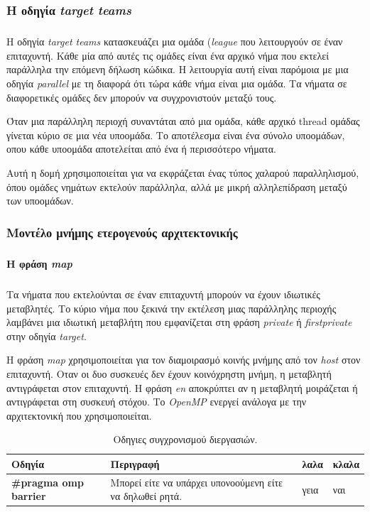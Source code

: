 \documentclass[12pt]{article}
\newcommand{\en}[1]{\foreignlanguage{english}{#1}}
\begin{document}
\subsubsection{H οδηγία \emph{\en{target teams}}}
\subparagraph{}
Η οδηγία \emph{\en{target teams}} κατασκευάζει μια ομάδα (\emph{\en{league}} που λειτουργούν σε έναν επιταχυντή. Κάθε μία από αυτές τις ομάδες είναι ένα αρχικό νήμα που εκτελεί παράλληλα την επόμενη δήλωση κώδικα. Η λειτουργία αυτή είναι παρόμοια με μια οδηγία \emph{\en{parallel}} με τη διαφορά ότι τώρα κάθε νήμα είναι μια ομάδα. Τα νήματα σε διαφορετικές ομάδες δεν μπορούν να συγχρονιστούν μεταξύ τους.

Όταν μια παράλληλη περιοχή συναντάται από μια ομάδα, κάθε αρχικό thread ομάδας γίνεται κύριο σε μια νέα υποομάδα. Το αποτέλεσμα είναι ένα σύνολο υποομάδων, οπου κάθε υποομάδα αποτελείται από ένα ή περισσότερο νήματα.

Αυτή η δομή χρησιμοποιείται για να εκφράζεται ένας τύπος χαλαρού παραλληλισμού, όπου ομάδες νημάτων εκτελούν παράλληλα, αλλά με μικρή αλληλεπίδραση μεταξύ των υποομάδων.


\subsubsection{Μοντέλο μνήμης ετερογενούς αρχιτεκτονικής}
\subparagraph{}

\paragraph{Η φράση \emph{\en{map}}}
\subparagraph{}
Τα νήματα που εκτελούνται σε έναν επιταχυντή μπορούν να έχουν ιδιωτικές μεταβλητές. Το κύριο νήμα που ξεκινά την εκτέλεση μιας παράλληλης περιοχής λαμβάνει μια ιδιωτική μεταβλήτη που εμφανίζεται στη φράση \emph{\en{private}} ή \emph{\en{firstprivate}} στην οδηγία \emph{\en{target}}.

Η φράση \emph{\en{map}} χρησιμοποιείται για τον διαμοιρασμό κοινής μνήμης από τον \emph{\en{host}} στον επιταχυντή. Οταν οι δυο συσκευές δεν έχουν κοινόχρηστη μνήμη, η μεταβλητή αντιγράφεται στον επιταχυντή. Η φράση \emph{\en{en}} αποκρύπτει αν η μεταβλητή μοιράζεται ή αντιγράφεται στη συσκευή στόχου. Το \emph{\en{OpenMP}} ενεργεί ανάλογα με την αρχιτεκτονική που χρησιμοποιείται.
\\

\begin{table}[htbp]
\captionsetup{justification=raggedright,
singlelinecheck=false
}
\caption{Οδηγιες συγχρονισμού διεργασιών.}
\def\arraystretch{1.5}
\begin{tabular}{| p{} | p{}|  p{} |  p{}|}

\textbf{Οδηγία} \cellcolor[HTML]{D0D0D0} & \textbf{Περιγραφή} \cellcolor[HTML]{D0D0D0} & λαλα & κλαλα \\
\hline
\textbf{\en{{\#}pragma omp barrier}} & Μπορεί είτε να υπάρχει υπονοούμενη είτε να δηλωθεί ρητά. & γεια & ναι \\
\hline
\end{tabular}
\end{table}
\end{document}
